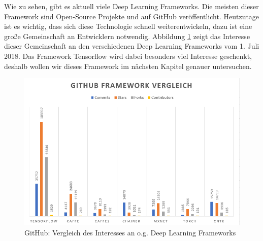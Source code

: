 Wie zu sehen, gibt es aktuell viele Deep Learning Frameworks. Die meisten dieser Framework sind Open-Source Projekte und auf GitHub veröffentlicht. Heutzutage ist es wichtig, dass sich diese Technologie schnell weiterentwickeln, dazu ist eine große Gemeinschaft an Entwicklern notwendig. Abbildung \ref{fig:githubinterestdeeplearning} zeigt das Interesse dieser Gemeinschaft an den verschiedenen Deep Learning Frameworks vom 1. Juli 2018. Das Framework Tensorflow wird dabei besonders viel Interesse geschenkt, deshalb wollen wir dieses Framework im nächsten Kapitel genauer untersuchen.

\begin{figure}
	\centering
	\includegraphics[width=0.9\linewidth]{Pictures/GitHubFrameworkVergleich}
	\caption[GitHub: Vergleich des Interesses in verschiedene Deep Learning Frameworks]{GitHub: Vergleich des Interesses an o.g. Deep Learning Frameworks}
	\label{fig:githubinterestdeeplearning}
\end{figure}
